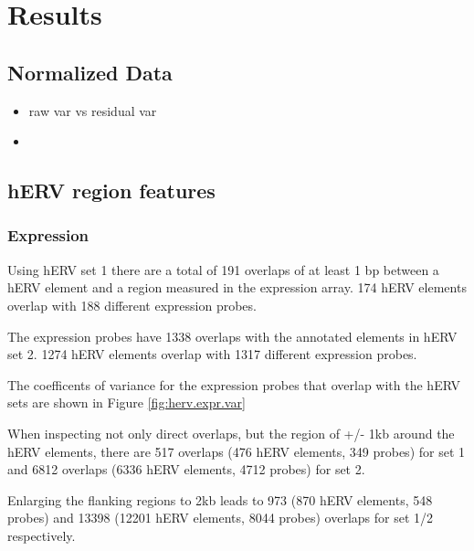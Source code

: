 \documentclass[a4paper,12pt]{article}
\begin{document}
\newpage
\section{Results}
\subsection{Normalized Data}
\begin{itemize}
\item raw var vs residual var
\item 
\end{itemize}
\subsection{hERV region features}
\subsubsection{Expression}
Using hERV set 1 there are a total of 191 overlaps of at least 1 bp between a hERV element and a region measured in the expression array. 174 hERV elements overlap with 188 different expression probes. 

The expression probes have 1338 overlaps with the annotated elements in hERV set 2. 1274 hERV elements overlap with 1317 different expression probes.

The coefficents of variance for the expression probes that overlap with the hERV sets are shown in Figure \ref{fig:herv.expr.var}

When inspecting not only direct overlaps, but the region of +/- 1kb around the hERV elements, there are 517 overlaps (476 hERV elements, 349 probes) for set 1 and 6812 overlaps (6336 hERV elements, 4712 probes) for set 2.

Enlarging the flanking regions to 2kb leads to 973 (870 hERV elements, 548 probes) and 13398 (12201 hERV elements, 8044 probes) overlaps for set 1/2 respectively.
\end{document}
